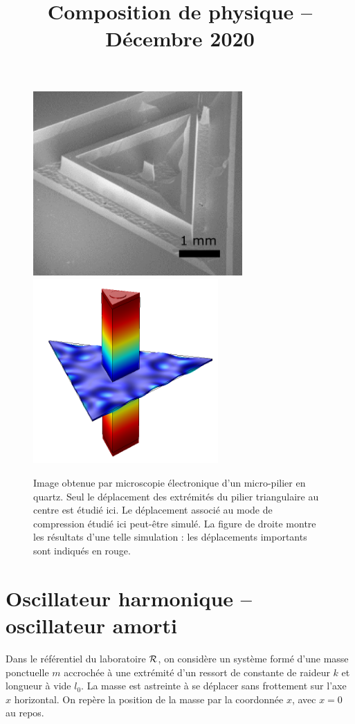 \documentclass[12pt,a4paper]{exam}
\title{Composition de physique -- Décembre 2020}
\date{}
\begin{document}
\maketitle

\begin{figure}[b!]
\center
\includegraphics[height=200pt]{figures/micropillar.png}
\includegraphics[height=200pt]{figures/micropillar_disp.png}
\caption{Image obtenue par microscopie électronique d'un micro-pilier en quartz.
Seul le déplacement des extrémités du pilier triangulaire au centre est étudié ici.
Le déplacement associé au mode de compression étudié ici peut-être simulé.
La figure de droite montre les résultats d'une telle simulation : les déplacements importants sont indiqués en rouge.}
\label{fig:micro_pillar}
\end{figure}

\section{Oscillateur harmonique -- oscillateur amorti}

Dans le référentiel du laboratoire $\cal{R}$, on considère un système formé d'une masse ponctuelle $m$ accrochée à une extrémité d'un ressort de constante de raideur $k$ et longueur à vide $l_0$.
La masse est astreinte à se déplacer sans frottement sur l'axe $x$ horizontal.
On repère la position de la masse par la coordonnée $x$, avec $x=0$ au repos.
\end{document}
